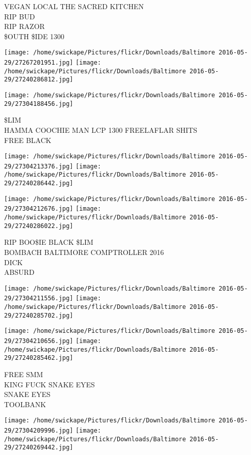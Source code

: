 \documentclass[10pt,letterpaper]{article}
\begin{document}
VEGAN LOCAL THE SACRED KITCHEN\\
RIP BUD\\
RIP RAZOR\\
\$OUTH \$IDE 1300
\pagebreak

\texttt{[image: /home/swickape/Pictures/flickr/Downloads/Baltimore 2016-05-29/27267201951.jpg]}
\texttt{[image: /home/swickape/Pictures/flickr/Downloads/Baltimore 2016-05-29/27240286812.jpg]}

\vspace{0.25in}
\texttt{[image: /home/swickape/Pictures/flickr/Downloads/Baltimore 2016-05-29/27304188456.jpg]}

\$LIM\\
HAMMA COOCHIE MAN LCP 1300 FREELAFLAR SHITS\\
FREE BLACK
\pagebreak

\texttt{[image: /home/swickape/Pictures/flickr/Downloads/Baltimore 2016-05-29/27304213376.jpg]}
\texttt{[image: /home/swickape/Pictures/flickr/Downloads/Baltimore 2016-05-29/27240286442.jpg]}

\texttt{[image: /home/swickape/Pictures/flickr/Downloads/Baltimore 2016-05-29/27304212676.jpg]}
\texttt{[image: /home/swickape/Pictures/flickr/Downloads/Baltimore 2016-05-29/27240286022.jpg]}

RIP BOO\$IE BLACK \$LIM\\
BOMBACH BALTIMORE COMPTROLLER 2016\\
DICK\\
ABSURD
\pagebreak

\texttt{[image: /home/swickape/Pictures/flickr/Downloads/Baltimore 2016-05-29/27304211556.jpg]}
\texttt{[image: /home/swickape/Pictures/flickr/Downloads/Baltimore 2016-05-29/27240285702.jpg]}

\texttt{[image: /home/swickape/Pictures/flickr/Downloads/Baltimore 2016-05-29/27304210656.jpg]}
\texttt{[image: /home/swickape/Pictures/flickr/Downloads/Baltimore 2016-05-29/27240285462.jpg]}

FREE SMM\\
KING FUCK SNAKE EYES\\
SNAKE EYES\\
TOOLBANK
\pagebreak

\texttt{[image: /home/swickape/Pictures/flickr/Downloads/Baltimore 2016-05-29/27304209996.jpg]}
\texttt{[image: /home/swickape/Pictures/flickr/Downloads/Baltimore 2016-05-29/27240269442.jpg]}
\end{document}
